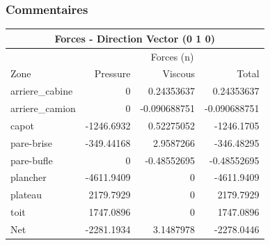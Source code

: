 \documentclass[handout]{beamer}
\begin{document}
\begin{frame}
	\frametitle{Commentaires}
	\begin{center}\begin{tabular}{|l|r r r|}
	\hline
	\multicolumn{4}{|c|}{Forces - Direction Vector (0 1 0)} \\
	\hline
			&   \multicolumn{3}{c|}{Forces (n)} \\
	\hline
	Zone                &     Pressure    &   Viscous     &   Total      \\
	\hline
	arriere\_cabine      &     0           &   0.24353637  &   0.24353637  \\ 
	arriere\_camion      &     0           &   -0.090688751&   -0.090688751\\ 
	capot               &     -1246.6932  &   0.52275052  &   -1246.1705  \\ 
	pare-brise          &     -349.44168  &   2.9587266   &   -346.48295  \\ 
	pare-bufle          &     0           &   -0.48552695 &   -0.48552695 \\ 
	plancher            &     -4611.9409  &   0           &   -4611.9409  \\ 
	plateau             &     2179.7929   &   0           &   2179.7929   \\ 
	toit                &     1747.0896   &   0           &   1747.0896   \\ 
	\hline
	\hline
	Net                 &     -2281.1934  &   3.1487978   &   -2278.0446  \\ 
	\hline
	\end{tabular}\end{center}
\end{frame}
\end{document}
